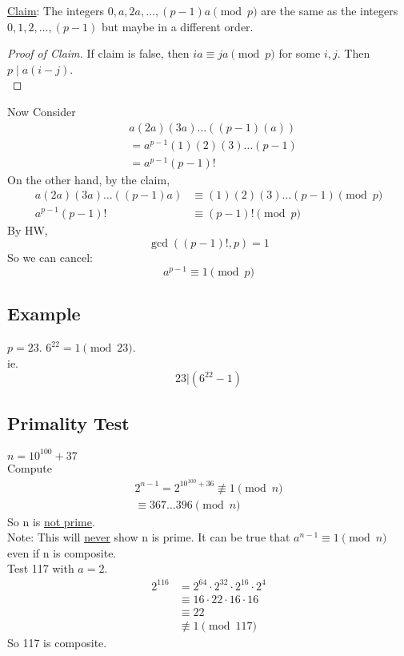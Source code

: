 \documentclass[letterpaper]{article}
\begin{document}
        \underline{Claim}: The integers $0,a,2a,\dots, (p-1)a \pmod{p}$
        are the same as the integers $0,1,2,\dots,(p-1)$ but maybe
        in a different order.

        \begin{proof} [Proof of Claim]
            If claim is false, then $ia\equiv ja\pmod{p}$ for some $i,j$. 
            Then $p\mid a(i-j)$. \\
        \end{proof}

        Now Consider
        \begin{align*}
            & a(2a)(3a)\dots((p-1)(a)) \\
            &= a^{p-1}(1)(2)(3)\dots(p-1) \\
            &= a^{p-1}(p-1)!
        \end{align*}
        On the other hand, by the claim, 
        \begin{align*}
            a(2a)(3a)\dots((p-1)a) &\equiv (1)(2)(3)\dots(p-1) \pmod{p} \\
            a^{p-1}(p-1)! &\equiv (p-1)! \pmod{p}
        \end{align*}
        By HW, 
        \[ \gcd((p-1)!, p) = 1 \]
        So we can cancel: 
        \[ a^{p-1}\equiv 1\pmod{p} \]
        
    \subsection{Example}
            $p=23$. $6^{22}=1\pmod{23}$.  \\
            ie. \[ 23|(6^{22}-1) \]
        
    \subsection{Primality Test}
    $n=10^{100}+37$ \\
    Compute 
    \begin{align*} 
        2^{n-1} = 2^{10^{100}+36}\not\equiv 1\pmod{n} \\
        \equiv 367\dots 396\pmod{n}
    \end{align*}
    So n is \underline{not prime}. \\
    Note: This will \underline{never} show n is prime. It can be true that $a^{n-1}\equiv 1\pmod{n}$
    even if n is composite. \\
    Test 117 with $a=2$. 
    \begin{align*}
        2^{116} &= 2^{64}\cdot 2^{32}\cdot 2^{16}\cdot 2^{4} \\
        &\equiv 16\cdot 22 \cdot 16 \cdot 16 \\
        &\equiv 22 \\
        &\not\equiv 1\pmod{117}
    \end{align*}
    So 117 is composite.     
\end{document}
